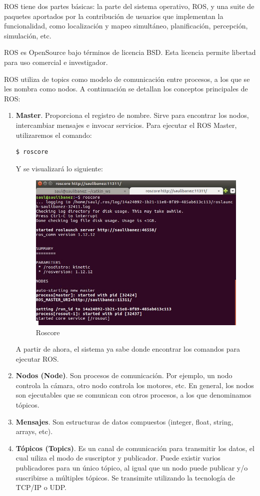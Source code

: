 ROS tiene dos partes básicas: la parte del sistema operativo, ROS, y una suite de paquetes aportados por la contribución de usuarios que implementan la funcionalidad, como localización y mapeo simultáneo, planificación, percepción, simulación, etc.

ROS es OpenSource bajo términos de licencia BSD. Esta licencia permite libertad para uso comercial e investigador.

ROS utiliza de topics como modelo de comunicación entre procesos, a los que se les nombra como nodos. A continuación se detallan los conceptos principales de ROS:
\begin{enumerate}
 \item \textbf{Master}. Proporciona el registro de nombre. Sirve para encontrar los nodos, intercambiar mensajes e invocar servicios. 
 Para ejecutar el ROS Master, utilizaremos el comando:
  \renewcommand{\lstlistingname}{}
  \begin{lstlisting}[caption=roscore, label={lst:roscore}]
    $ roscore
  \end{lstlisting}
  
  Y se visualizará lo siguiente:
  
  \begin{figure} [hbtp]
  \begin{center}
    \includegraphics[width=12cm]{img/cap1/roscore}
  \end{center}
  \caption{Roscore}
  \label{fig:roscore}
  \end{figure}
  
  A partir de ahora, el sistema ya sabe donde encontrar los comandos para ejecutar ROS.
  \item \textbf{Nodos (Node)}. Son procesos de comunicación. Por ejemplo, un nodo controla la cámara, otro nodo controla los motores, etc. En general, los nodos son ejecutables que se comunican con otros procesos, a los que denominamos tópicos.
  \item \textbf{Mensajes}. Son estructuras de datos compuestos (integer, float, string, arrays, etc).
  \item \textbf{Tópicos (Topics)}. Es un canal de comunicación para transmitir los datos, el cual uiliza el modo de suscriptor y publicador. Puede existir varios publicadores para un único tópico, al igual que un nodo puede publicar y/o suscribirse a múltiples tópicos.
  Se transimite utilizando la tecnología de TCP/IP o UDP.
\end{enumerate}


